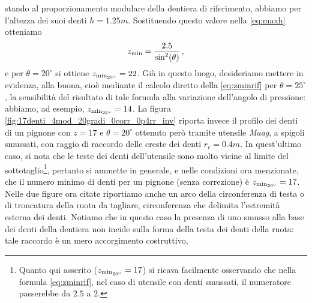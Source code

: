  stando al proporzionamento modulare della dentiera di riferimento,
abbiamo per l'altezza dei suoi denti $h=1.25 m$.  Sostituendo questo valore nella
\ref{eq:maxh} otteniamo
\begin{equation}
z_{\rm min}=\frac{2.5}{\sin^2(\theta)}\,,
\label{eq:zminrif}
\end{equation}
\noindent e per $\theta= 20^{\circ}$ si  ottiene
$z_{{\rm min}_{20^{\circ}}}=22$. Gi\`a in questo luogo, desideriamo
mettere in evidenza, alla buona, cio\`e mediante il calcolo
diretto della \ref{eq:zminrif} per
$\theta=25^{\circ}$, la sensibilit\`a del risultato di
 tale formula alla variazione dell'angolo di 
pressione: abbiamo, ad esempio, $z_{{\rm min}_{25^{\circ}}}=14$. La figura
\ref{fig:17denti_4mod_20gradi_0corr_0p4rr_inv} riporta invece il
profilo dei denti di un pignone con $z=17$ e $\theta = 20^{\circ}$ ottenuto per\`o
tramite utensile {\em Maag}, a spigoli smussati, con raggio di raccordo delle creste
dei denti $r_r=0.4m$.
In quest'ultimo caso, si nota che le teste dei denti
dell'utensile sono molto vicine al limite del sottotaglio\footnote{
Quanto qui asserito ($z_{{\rm min}_{20^{\circ}}}=17$) si ricava facilmente
osservando che nella formula \ref{eq:zminrif}, nel caso di utensile con denti
 smussati, il numeratore passerebbe da $2.5$ a $2$.
},
pertanto si ammette in generale,
e nelle condizioni ora menzionate, che il numero minimo  di denti per
un pignone (senza correzione) \`e $z_{{\rm min}_{20^{\circ}}}=17$.
Nelle due figure ora citate riportiamo anche un arco della circonferenza di
testa o di troncatura della ruota da tagliare, circonferenza che delimita
l'estremit\`a esterna dei denti.
Notiamo che in questo caso
la presenza di uno smusso alla base dei denti della dentiera non
incide sulla forma della testa dei denti della ruota:
 tale raccordo \`e un mero accorgimento costruttivo,
